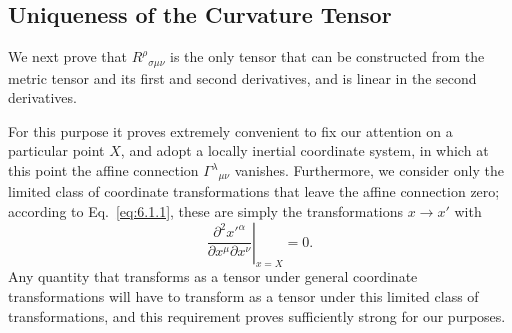 
\subsection{Uniqueness of the Curvature Tensor}\label{sec:6.2}

We next prove that \(R^\rho{}_{\sigma\mu\nu}\) is the only tensor that can be
constructed from the metric tensor and its first and second derivatives, and
is linear in the second derivatives.

For this purpose it proves extremely convenient to fix our attention on a
particular point \(X\), and adopt a locally inertial coordinate system, in
which at this point the affine connection
\(\Gamma^\lambda{}_{\mu\nu}\) vanishes. Furthermore, we consider only the
limited class of coordinate transformations that leave the affine connection
zero; according to Eq.~\eqref{eq:6.1.1}, these are simply the transformations
\(x\to x'\) with
\begin{equation}
  \left.
  \frac{\partial^2x'^\alpha}{\partial x^\mu\partial x^\nu}
  \right|_{x=X}
  =0.
  \tag{6.2.1}\label{eq:6.2.1}
\end{equation}
Any quantity that transforms as a tensor under general coordinate
transformations will have to transform as a tensor under this limited class of
transformations, and this requirement proves sufficiently strong for our
purposes.

